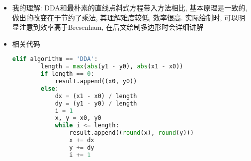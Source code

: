 \documentclass[a4paper,UTF8]{article}
\theoremstyle{definition}
\begin{document}
\begin{itemize}
  

  \item 我的理解: DDA和最朴素的直线点斜式方程带入方法相比, 基本原理是一致的, 做出的改变在于节约了乘法, 其理解难度较低, 效率很高. 实际绘制时, 可以明显注意到效率高于Bresenham, 在后文绘制多边形时会详细讲解
  \item 相关代码
  \begin{lstlisting}[language={Python}]  
    elif algorithm == 'DDA':
        length = max(abs(y1 - y0), abs(x1 - x0))
        if length == 0: 
            result.append((x0, y0))
        else:
            dx = (x1 - x0) / length
            dy = (y1 - y0) / length
            i = 1
            x, y = x0, y0
            while i <= length:
                result.append((round(x), round(y)))
                x += dx
                y += dy
                i += 1\end{lstlisting}
\end{itemize}
\end{document}
